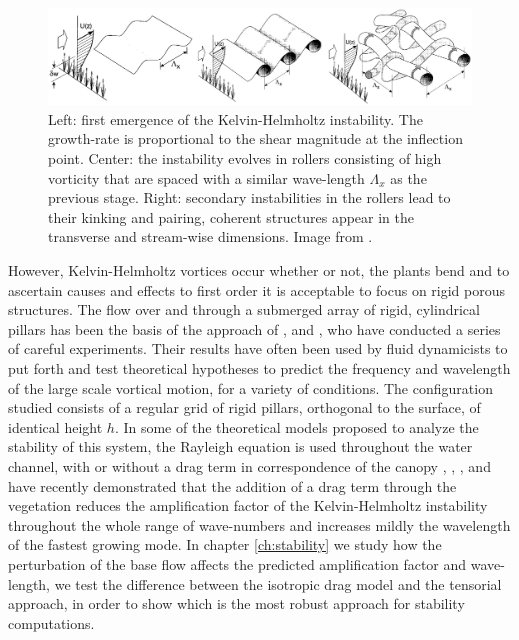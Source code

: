 \begin{figure}[h]
	\centering
	\includegraphics[width=1\linewidth]{chapter_1/finn}
	\caption{Left: first emergence of the Kelvin-Helmholtz instability. The growth-rate is proportional to the shear magnitude at the inflection point. Center: the instability evolves in rollers consisting of high vorticity that are spaced with a similar wave-length $\Lambda_x$ as the previous stage.  Right: secondary instabilities in the rollers lead to their kinking and pairing, coherent structures appear in the transverse and stream-wise dimensions. Image from \citet{finnigan2000turbulence}.}
	\label{fig:monai_evol}
\end{figure}


However, Kelvin-Helmholtz vortices occur whether or not, the plants bend and to ascertain causes and effects to first order it is acceptable to focus on rigid porous structures.
The flow over and through a submerged array of rigid, cylindrical pillars has been the basis of the approach of \citet{ghisalberti2002mixing}, \citet{ghisalberti2004limited} and \citet{ghisalberti2005mass}, who have conducted a series of careful experiments. Their results have often been used by fluid dynamicists to put forth and test theoretical hypotheses to predict the frequency and wavelength of the large scale vortical motion, for a variety of conditions.
The configuration studied consists of a regular grid of rigid pillars, orthogonal to the surface, of identical height $h$.
In some of the theoretical models proposed to analyze the stability of this system, the Rayleigh equation is
used throughout the water channel, with or without a drag term in correspondence of the canopy \citet{raupach1996coherent}, \citet{py2004mixing}, \citet{singh2016linear}, \citet{zampogna2016instability} and \citet{luminari2016drag} have recently demonstrated that the addition of a drag term through the vegetation reduces the amplification factor of the Kelvin-Helmholtz instability throughout the whole range of wave-numbers and increases mildly the wavelength of the fastest growing mode.
In chapter \ref{ch:stability} we study how the perturbation of the base flow affects the predicted amplification factor and wave-length, we test the difference between the isotropic drag model and the tensorial approach, in order to show which is the most robust approach for stability computations.





